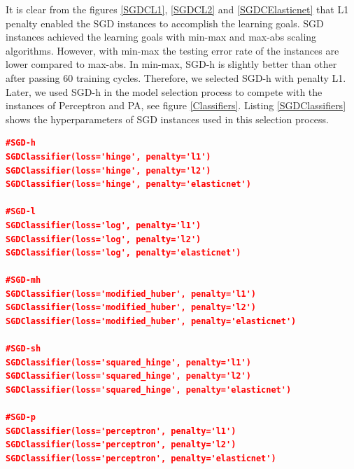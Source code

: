 \documentclass[a4paper,12pt]{article}
\begin{document}
It is clear from the figures \ref{SGDCL1}, \ref{SGDCL2} and \ref{SGDCElasticnet} that L1 penalty enabled the SGD instances to accomplish the learning goals. SGD instances achieved the learning goals with min-max and max-abs scaling algorithms. However, with min-max the testing error rate of the instances are lower compared to max-abs. In min-max, SGD-h is slightly better than other after passing 60 training cycles. Therefore, we selected SGD-h with penalty L1. Later, we used SGD-h in the model selection process to compete with the instances of Perceptron and PA, see figure \ref{Classifiers}. Listing \ref{SGDClassifiers} shows the hyperparameters of SGD instances used in this selection process.
\begin{lstlisting}[language=json, caption=Hyperparameters of SGD instances for classification, label=SGDClassifiers]
#SGD-h
SGDClassifier(loss='hinge', penalty='l1')
SGDClassifier(loss='hinge', penalty='l2')
SGDClassifier(loss='hinge', penalty='elasticnet')

#SGD-l
SGDClassifier(loss='log', penalty='l1')
SGDClassifier(loss='log', penalty='l2')
SGDClassifier(loss='log', penalty='elasticnet')

#SGD-mh
SGDClassifier(loss='modified_huber', penalty='l1')
SGDClassifier(loss='modified_huber', penalty='l2')
SGDClassifier(loss='modified_huber', penalty='elasticnet')

#SGD-sh
SGDClassifier(loss='squared_hinge', penalty='l1')
SGDClassifier(loss='squared_hinge', penalty='l2')
SGDClassifier(loss='squared_hinge', penalty='elasticnet')

#SGD-p
SGDClassifier(loss='perceptron', penalty='l1')
SGDClassifier(loss='perceptron', penalty='l2')
SGDClassifier(loss='perceptron', penalty='elasticnet')
\end{lstlisting}
\end{document}

